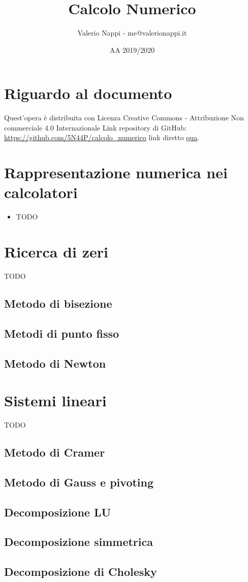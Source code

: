 \documentclass{article}
\title{Calcolo Numerico}
\author{Valerio Nappi - me@valerionappi.it}
\date{AA 2019/2020}
\begin{document}
\maketitle

\section{Riguardo al documento}
Quest'opera è distribuita con Licenza Creative Commons - Attribuzione Non commerciale 4.0 Internazionale \ccbynceu  \newline
Link repository di GitHub: \url{https://github.com/5N44P/calcolo_numerico} link diretto \href{https://github.com/5N44P/calcolo_numerico/blob/master/recap_calcolo.pdf}{qua}. \newline 

\section{Rappresentazione numerica nei calcolatori}
\begin{itemize}
	\item TODO
\end{itemize}

\section{Ricerca di zeri}
TODO  

\subsection{Metodo di bisezione}

\subsection{Metodi di punto fisso}

\subsection{Metodo di Newton}


\section{Sistemi lineari}
TODO  

\subsection{Metodo di Cramer}

\subsection{Metodo di Gauss e pivoting}

\subsection{Decomposizione LU}

\subsection{Decomposizione simmetrica}

\subsection{Decomposizione di Cholesky}
\end{document}
